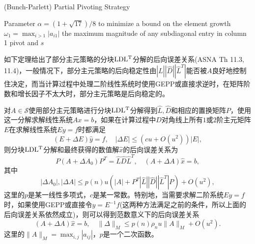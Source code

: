 \documentclass[a4paper,10pt]{ctexart}
\begin{document}
\begin{algorithm}[htbp]
    \caption{(Bunch-Parlett) Partial Pivoting Strategy}\label{alg:LDLPP}
    Parameter $ \alpha = (1+\sqrt{17}) / 8 $ to minimize a bound on the element growth\;
    $ \omega_1 = \max_{i>1}|a_{i1}| $ the maximum magnitude of any subdiagonal entry in column 1\;
    \Return pivot and $ s $\;
\end{algorithm}
如下定理给出了部分主元策略的分块$ {\rm LDL^T} $分解的后向误差关系(ASNA Th 11.3, 11.4)，一般情况下，部分主元策略的后向稳定性由$ |\hat{L}| |\hat{D}| |\hat{L}^T| $能否被$ A $良好地控制住决定，而当计算过程中处理二阶线性系统时使用GEPP或直接求逆时，在矩阵阶数和增长因子不太大时，部分主元策略是后向稳定的。
\begin{theorem}\label{th:LDLPP}
    对$ A\in \mathcal{S} $使用部分主元策略进行分块$ {\rm LDL^T} $分解得到$ \hat{L},\hat{D} $和相应的置换矩阵$ P $，使用这一分解求解线性系统$ Ax=b $，如果在计算过程中$ D $对角线上所有$ 1 $或$ 2 $阶主元矩阵$ E $在求解线性系统$ Ey=f $时都满足
    \[
        (E+\Delta E) \hat{y} = f,\quad |\Delta E|\leqslant (cu +O(u^2))|E|,
    \]
    则分块$ {\rm LDL^T} $分解和最终获得的数值解$ \hat{x} $的后向误差关系为
    \[
        P(A+\Delta A_0)P^T = \hat{L} \hat{D} \hat{L}^T,\quad (A+\Delta A)\hat{x} = b,
    \]
    其中
    \[
        |\Delta A_0|,|\Delta A|\leqslant p(n)u(|A|+P^T|\hat{L}| |\hat{D}| |\hat{L}^T|P)+O(u^2),
    \]
    这里的$ p $是某一线性多项式，$ c $是某一常数。特别地，当需要求解二阶系统$ Ey=f $时，如果使用GEPP或直接令$ y=E^{-1}f $(这两种方法满足之前的条件，所以上面的后向误差关系依然成立)，则可以得到范数意义下的后向误差关系
    \[
        (A+\Delta A)\hat{x} = b,\quad \| \Delta \|_M \leqslant p(n)\rho_n u \| A \|_M + O(u^2).
    \]
    这里的$ \| A \|_M = \max_{i,j}|a_{ij}| $，$ p $是一个二次函数。
\end{theorem}
\end{document}
